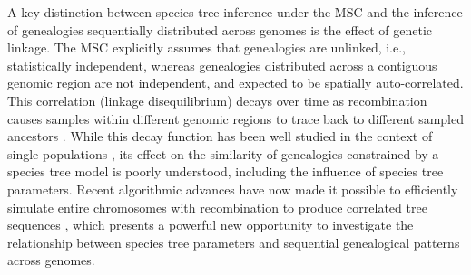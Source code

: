 \documentclass[11pt]{article}
\begin{document}


A key distinction between species tree inference under the MSC and the inference of genealogies sequentially distributed across genomes is the effect of genetic linkage. The MSC explicitly assumes that genealogies are unlinked, i.e., statistically independent, whereas genealogies distributed across a contiguous genomic region are not independent, and expected to be spatially auto-correlated. This correlation (linkage disequilibrium) decays over time as recombination causes samples within different genomic regions to trace back to different sampled ancestors \citep{hudson_coalescent_1988}. While this decay function has been well studied in the context of single populations \citep{mcvean_approximating_2005}, its effect on the similarity of genealogies constrained by a species tree model is poorly understood, including the influence of species tree parameters. Recent algorithmic advances have now made it possible to efficiently simulate entire chromosomes with recombination to produce correlated tree sequences \citep{kelleher_efficient_2016}, which presents a powerful new opportunity to investigate the relationship between species tree parameters and sequential genealogical patterns across genomes.
\end{document}
